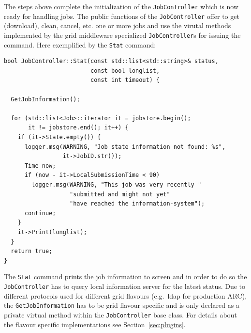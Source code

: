 \documentclass{book}
\newcommand{\JobController}{\texttt{JobController}}
\begin{document}
The steps above complete the initialization of the {\JobController}
which is now ready for handling jobs. The public functions of the
{\JobController} offer to get (download), clean, cancel, etc. one or
more jobs and use the virutal methods implemented by the grid middleware 
specialized {\JobController}s for issuing the command. Here exemplified 
by the \texttt{Stat} command:

\begin{shaded}
\begin{small}
\begin{verbatim}
bool JobController::Stat(const std::list<std::string>& status,
                         const bool longlist,
                         const int timeout) {

  GetJobInformation();

  for (std::list<Job>::iterator it = jobstore.begin();
       it != jobstore.end(); it++) {
    if (it->State.empty()) {
      logger.msg(WARNING, "Job state information not found: %s",
                 it->JobID.str());
      Time now;
      if (now - it->LocalSubmissionTime < 90)
        logger.msg(WARNING, "This job was very recently "
                   "submitted and might not yet"
                   "have reached the information-system");
      continue;
    }
    it->Print(longlist);
  }
  return true;
}
\end{verbatim}
\end{small}
\end{shaded}

The \texttt{Stat} command prints the job information to screen and in
order to do so the {\JobController} has to query local information
server for the latest status. Due to different protocols used for
different grid flavours (e.g.\ ldap for production ARC), the
\texttt{GetJobInformation} has to be grid flavour specific and is only
declared as a private virtual method within the {\JobController} base
class. For details about the flavour specific implementations see
Section~\ref{sec:plugins}.
\end{document}
